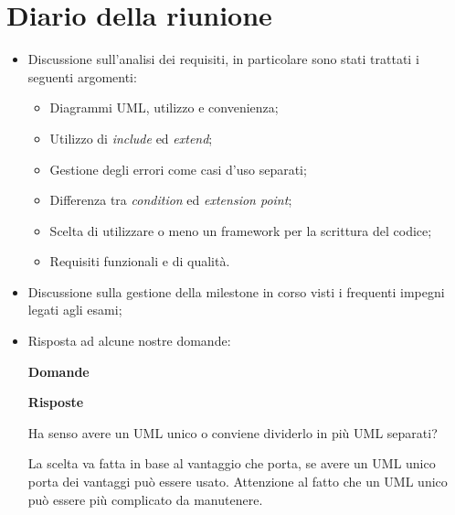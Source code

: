 \section{Diario della riunione}
\begin{itemize}
  \item Discussione sull'analisi dei requisiti, in particolare sono stati trattati i seguenti argomenti:
  \begin{itemize}
    \item Diagrammi UML, utilizzo e convenienza;
    \item Utilizzo di \textit{include} ed \textit{extend};
    \item Gestione degli errori come casi d'uso separati;
    \item Differenza tra \textit{condition} ed \textit{extension point};
    \item Scelta di utilizzare o meno un framework per la scrittura del codice;
    \item Requisiti funzionali e di qualità.
  \end{itemize}
  \item Discussione sulla gestione della milestone in corso visti i frequenti impegni legati agli esami;
  \item Risposta ad alcune nostre domande:

  \begin{spacing}{2}
  \end{spacing}

  \begin{minipage}[b]{0.47\textwidth}
    \centering
    \textbf{Domande}
  \end{minipage}
  \hfill
  \begin{minipage}[b]{0.47\textwidth}
    \centering
    \textbf{Risposte}
  \end{minipage}

  \begin{spacing}{3}
  \end{spacing}

  \begin{minipage}[c]{0.47\textwidth}
    \centering
    Ha senso avere un UML unico o conviene dividerlo in più UML separati?
  \end{minipage}
  \hfill
  \begin{minipage}[c]{0.47\textwidth}
    \centering
    La scelta va fatta in base al vantaggio che porta, se avere un UML unico porta dei vantaggi può essere usato. Attenzione al fatto che un UML unico può essere più complicato da manutenere.
  \end{minipage}


\end{itemize}
